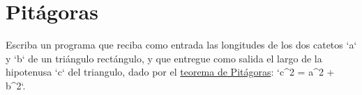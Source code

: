 \section{Pitágoras}

Escriba un programa que reciba como entrada las longitudes de los dos
catetos `a` y `b` de un triángulo rectángulo, y que entregue como salida
el largo de la hipotenusa `c` del triangulo, dado por el
\href{http://es.wikipedia.org/wiki/Teorema\_de\_Pit\%C3\%A1goras}{teorema
de Pitágoras}: `c\^{}2 = a\^{}2 + b\^{}2`.

